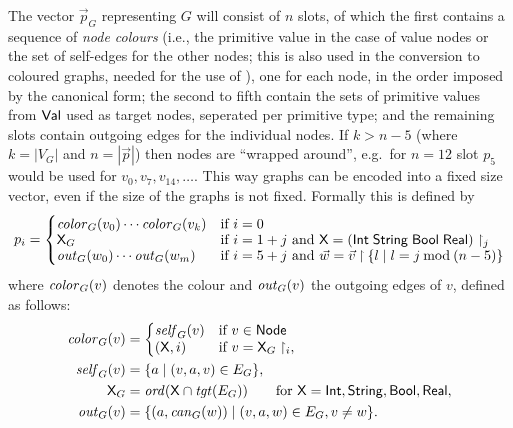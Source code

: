 The vector $\vec p_G$ representing $G$ will consist of $n$ slots, of which the
first contains a sequence of \emph{node colours} 
(i.e., the primitive value in the case of value nodes or the set of self-edges for 
the other nodes; this is also used in the conversion to coloured graphs, needed for the use of \BLISS), 
one for each node, in the order
imposed by the canonical form; the second to fifth contain the sets of
primitive values from $\mathsf{Val}$ used as target nodes, seperated per primitive
type; and the remaining slots contain outgoing edges for the individual
nodes. If $k>n-5$ (where $k=|V_G|$ and $n=|\vec p|$) then nodes are ``wrapped
around'', e.g.\ for $n=12$ slot $p_5$ would be used for $v_0, v_7, v_{14},
\ldots$. 
This way graphs can be encoded into a fixed size vector, 
even if the size of the graphs is not fixed.
Formally this is defined by 
%
\[ 
p_i = \begin{cases}
\mathit{color}_G(v_0)\cdots \mathit{color}_G(v_k)
 & \mbox{if $i=0$}
 \\[-\smallskipamount]
\mathsf{X}_G
 & \mbox{if $i=1+j$ and $\mathsf{X}=(\mathsf{Int}\;\mathsf{String}\;\mathsf{Bool}\;\mathsf{Real})\restriction_j$}
 \\[-\smallskipamount]
\mathit{out}_G(w_0) \cdots \mathit{out}_G(w_m)
 & \mbox{if $i=5+j$ and $\vec w=\vec v\mathbin{\upharpoonright}{\textstyle\mathopen\{ l \mid l=j\mathbin{\mathrm{mod}}(n-5) \mathclose\}}$}
\end{cases}
\]
%
where $\mathit{color}_G(v)$ denotes the colour and $\mathit{out}_G(v)$ the outgoing edges of
$v$, defined as follows:
%
\begin{align*}
\col_G(v)
 & = \left\{\begin{array}{@{}ll}
       \self_G(v) & \mbox{if $v\in \Node$} \\
       (\X,i) & \mbox{if $v=\X_G\restriction_i$},
     \end{array}\right.  \\
\self_G(v)
 & = \genset{a}{(v,a,v)\in E_G}, \\
\X_G
 & = \ord(\X\cap \tgt(E_G))
     \qquad \mbox{for $\X=\Int,\String,\Bool,\Real$}, \\
\out_G(v)
 & = \genset{(a,\can_G(w))}{(v,a,w)\in E_G, v\neq w}.
\end{align*}
%
